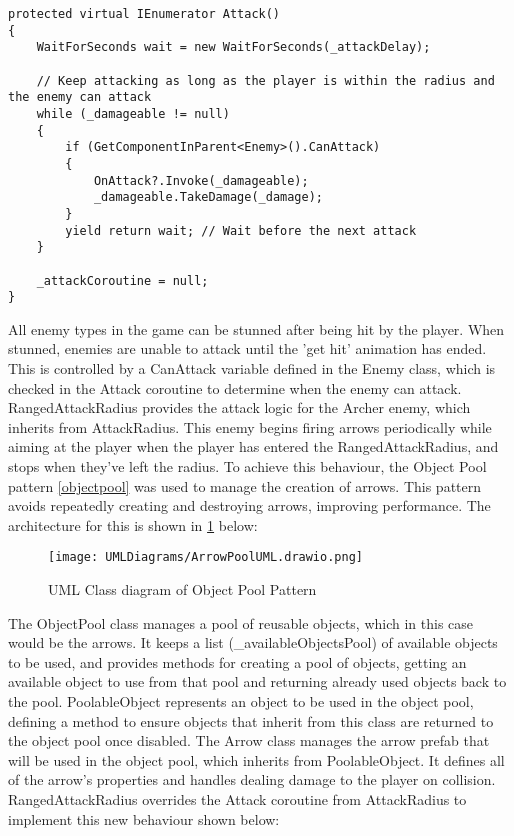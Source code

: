 \documentclass[]{final_report}
\begin{document}
\begin{verbatim}
protected virtual IEnumerator Attack()
{
    WaitForSeconds wait = new WaitForSeconds(_attackDelay);

    // Keep attacking as long as the player is within the radius and the enemy can attack
    while (_damageable != null)
    {
        if (GetComponentInParent<Enemy>().CanAttack)
        {
            OnAttack?.Invoke(_damageable);
            _damageable.TakeDamage(_damage);
        }
        yield return wait; // Wait before the next attack
    }

    _attackCoroutine = null;
}
\end{verbatim}
\color{red} All enemy types in the game can be stunned after being hit by the player. When stunned, enemies are unable to attack until the 'get hit' animation has ended. This is controlled by a CanAttack variable defined in the Enemy class, which is checked in the Attack coroutine to determine when the enemy can attack. RangedAttackRadius provides the attack logic for the Archer enemy, which inherits from AttackRadius. This enemy begins firing arrows periodically while aiming at the player when the player has entered the RangedAttackRadius, and stops when they've left the radius. To achieve this behaviour, the Object Pool pattern \ref{objectpool} was used to manage the creation of arrows. This pattern avoids repeatedly creating and destroying arrows, improving performance. The architecture for this is shown in \ref{fig:label_objpool} below:
\begin{figure}[H]
    \centering
    \texttt{[image: UMLDiagrams/ArrowPoolUML.drawio.png]}
    \caption{UML Class diagram of Object Pool Pattern}
    \label{fig:label_objpool}
\end{figure}
The ObjectPool class manages a pool of reusable objects, which in this case would be the arrows. It keeps a list (\_availableObjectsPool) of available objects to be used, and provides methods for creating a pool of objects, getting an available object to use from that pool and returning already used objects back to the pool. PoolableObject represents an object to be used in the object pool, defining a method to ensure objects that inherit from this class are returned to the object pool once disabled. The Arrow class manages the arrow prefab that will be used in the object pool, which inherits from PoolableObject. It defines all of the arrow's properties and handles dealing damage to the player on collision. RangedAttackRadius overrides the Attack coroutine from AttackRadius to implement this new behaviour shown below:
\end{document}

